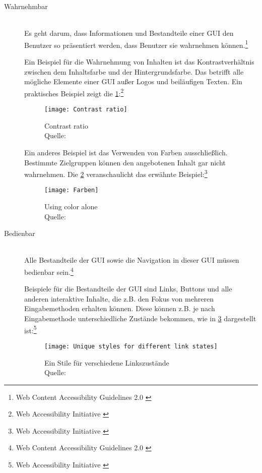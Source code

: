 \begin{description}
	\item [Wahrnehmbar]\hfill \\
	Es geht darum, dass Informationen und Bestandteile einer \ac{GUI} den Benutzer so präsentiert werden, dass Benutzer sie wahrnehmen 
	können.\footnote{Web Content Accessibility Guidelines 2.0 \cite{WCAG2.0}}
	
	Ein Beispiel für die Wahrnehmung von Inhalten ist das Kontrastverhältnis zwischen dem Inhaltsfarbe und der Hintergrundsfarbe. Das betrifft alle 
	mögliche Elemente einer \ac{GUI} außer Logos und beiläufigen Texten. Ein praktisches Beispiel zeigt die \cref{fig:Contrast ratio}:\footnote{Web Accessibility 
	Initiative \cite{WAI}}
	
	\begin{figure}[H]
		\centering
		\texttt{[image: Contrast ratio]}
		\caption[Contrast ratio]{Contrast ratio \\Quelle: \cite{WAI}}
		\label{fig:Contrast ratio}
	\end{figure}
	
	Ein anderes Beispiel ist das Verwenden von Farben ausschließlich. Bestimmte Zielgruppen können den angebotenen Inhalt gar nicht wahrnehmen. Die 
	\ref{fig:using color alone} veranschaulicht das erwähnte Beispiel:\footnote{Web Accessibility Initiative \cite{WAI}}
	
	\begin{figure}[H]
		\centering
		\texttt{[image: Farben]}
		\caption[Using color alone]{Using color alone \\Quelle: \cite{WAI}}
		\label{fig:using color alone}
	\end{figure}
	
	\item [Bedienbar]\hfill \\
	Alle Bestandteile der \ac{GUI} sowie die Navigation in dieser \ac{GUI} müssen bedienbar sein.\footnote{Web Content Accessibility Guidelines 2.0 \cite{WCAG2.0}}
	
	Beispiele für die Bestandteile der \ac{GUI} sind Links, Buttons und alle anderen interaktive Inhalte, die z.B. den Fokus von mehreren Eingabemethoden erhalten 
	können. Diese können z.B. je nach Eingabemethode unterschiedliche Zustände bekommen, wie in \cref{fig:Ein Stile für verschiedene Linkszustände} dargestellt 
	ist:\footnote{Web Accessibility Initiative \cite{WAI}}
	
	\begin{figure}[H]
		\centering
		\texttt{[image: Unique styles for different link states]}
		\caption[Ein Stile für verschiedene Linkszustände]{Ein Stile für verschiedene Linkszustände \\Quelle: \cite{WAI}}
		\label{fig:Ein Stile für verschiedene Linkszustände}
	\end{figure}
	

\end{description}
